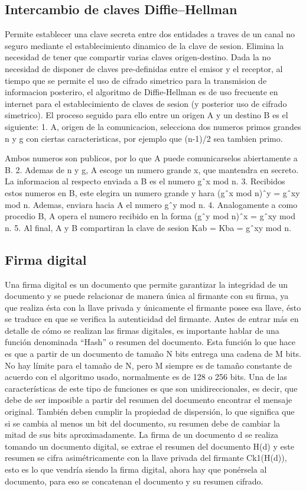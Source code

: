 \subsection{Intercambio de claves Diffie–Hellman}
Permite establecer una clave secreta entre dos entidades a traves de un canal no
seguro mediante el establecimiento dinamico de la clave de sesion.
Elimina la necesidad de tener que compartir varias claves origen-destino. Dada
la no necesidad de disponer de claves pre-definidas entre el emisor y el receptor,
al tiempo que se permite el uso de cifrado simetrico para la transmision de
informacion posteriro, el algoritmo de Diffie-Hellman es de uso frecuente en
internet para el establecimiento de claves de sesion (y posterior uso de cifrado
simetrico). El proceso seguido para ello entre un origen A y un destino B es el
siguiente: 1. A, origen de la comunicacion, selecciona dos numeros primos grandes
n y g con ciertas caracteristicas, por ejemplo que (n-1)/2 sea tambien primo.

Ambos numeros son publicos, por lo que A puede comunicarselos abiertamente a
B. 2. Ademas de n y g, A escoge un numero grande x, que mantendra en secreto.
La informacion al respecto enviada a B es el numero gˆx mod n. 3. Recibidos
estos numeros en B, este elegira un numero grande y hara (gˆx mod n)ˆy =
gˆxy mod n. Ademas, enviara hacia A el numero gˆy mod n. 4. Analogamente
a como procedio B, A opera el numero recibido en la forma (gˆy mod n)ˆx =
gˆxy mod n. 5. Al final, A y B compartiran la clave de sesion Kab = Kba =
gˆxy mod n.
\subsection{Firma digital}
Una firma digital es un documento que permite garantizar la integridad de un documento y se puede
relacionar de manera única al firmante con su firma, ya que realiza ésta con la llave privada y únicamente
el firmante posee esa llave, ésto se traduce en que se verifica la autenticidad del firmante.
Antes de entrar más en detalle de cómo se realizan las firmas digitales, es importante hablar de una
función denominada “Hash” o resumen del documento. Esta función lo que hace es que a partir de un
documento de tamaño N bits entrega una cadena de M bits. No hay límite para el tamaño de N, pero M
siempre es de tamaño constante de acuerdo con el algoritmo usado, normalmente es de 128 o 256 bits.
Una de las características de este tipo de funciones es que son unidireccionales, es decir, que debe de
ser imposible a partir del resumen del documento encontrar el mensaje original. También deben cumplir
la propiedad de dispersión, lo que significa que si se cambia al menos un bit del documento, su resumen
debe de cambiar la mitad de sus bits aproximadamente.
La firma de un documento d se realiza tomando un documento digital, se extrae el resumen del
documento H(d) y este resumen se cifra asimétricamente con la llave privada del firmante Ck1(H(d)), esto
es lo que vendría siendo la firma digital, ahora hay que ponérsela al documento, para eso se concatenan
el documento y su resumen cifrado.

